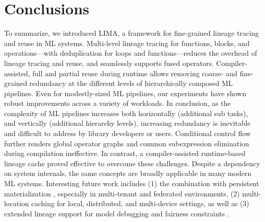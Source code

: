 \section{Conclusions}
\label{sec:conclude}

To summarize, we introduced LIMA, a framework for fine-grained lineage tracing and reuse in ML systems. Multi-level lineage tracing for functions, blocks, and operations---with deduplication for loops and functions---reduces the overhead of lineage tracing and reuse, and seamlessly supports fused operators. Compiler-assisted, full and partial reuse during runtime allows removing coarse- and fine-grained redundancy at the different levels of hierarchically composed ML pipelines. Even for modestly-sized ML pipelines, our experiments have shown robust improvements across a variety of workloads. 
In conclusion, as the complexity of ML pipelines increases both horizontally (additional sub tasks), and vertically (additional hierarchy levels), increasing redundancy is inevitable and difficult to address by library developers or users. Conditional control flow further renders global operator graphs and common subexpression elimination during compilation ineffective. In contrast, a compiler-assisted runtime-based lineage cache proved effective to overcome these challenges. Despite a dependency on system internals, the same concepts are broadly applicable in many modern ML systems.
Interesting future work includes (1) the combination with persistent materialization \cite{VartakTMZ18,XinMMLSP18}, especially in multi-tenant and federated environments, (2) multi-location caching for local, distributed, and multi-device settings, as well as (3) extended lineage support for model debugging and  fairness constraints \cite{mlinspect21}.